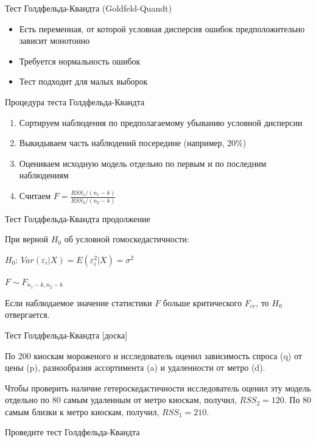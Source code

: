 \documentclass[ignorenonframetext,]{beamer}
\newcommand{\e}{\varepsilon}
\begin{document}
\begin{frame}{Тест Голдфельда-Квандта (Goldfeld-Quandt)}

\begin{itemize}
\item
  Есть переменная, от которой условная дисперсия ошибок предположительно
  зависит монотонно
\item
  Требуется нормальность ошибок
\item
  Тест подходит для малых выборок
\end{itemize}

\end{frame}

\begin{frame}{Процедура теста Голдфельда-Квандта}

\begin{enumerate}
\def\labelenumi{\arabic{enumi}.}
\item
  Сортируем наблюдения по предполагаемому убыванию условной дисперсии
\item
  Выкидываем часть наблюдений посередине (например, 20\%)
\item
  Оцениваем исходную модель отдельно по первым и по последним
  наблюдениям
\item
  Считаем \(F=\frac{RSS_1/(n_1-k)}{RSS_2/(n_2-k)}\)
\end{enumerate}

\end{frame}

\begin{frame}{Тест Голдфельда-Квандта продолжение}

При верной \(H_0\) об условной гомоскедастичности:

\(H_0\): \(Var(\e_i|X)=E(\varepsilon^2_i|X)=\sigma^2\)

\(F\sim F_{n_1-k,n_2-k}\)

Если наблюдаемое значение статистики \(F\) больше критического
\(F_{cr}\), то \(H_0\) отвергается.

\end{frame}

\begin{frame}{Тест Голдфельда-Квандта {[}доска{]}}

По 200 киоскам мороженого и исследователь оценил зависимость спроса (q)
от цены (p), разнообразия ассортимента (a) и удаленности от метро (d).

Чтобы проверить наличие гетероскедастичности исследователь оценил эту
модель отдельно по 80 самым удаленным от метро киоскам, получил,
\(RSS_2=120\). По 80 самым близки к метро киоскам, получил,
\(RSS_1=210\).

Проведите тест Голдфельда-Квандта

\end{frame}
\end{document}
